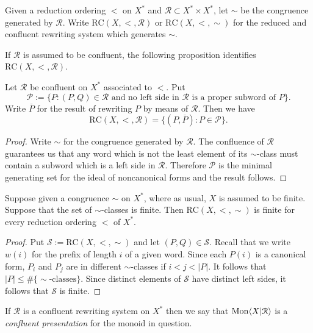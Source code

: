 \begin{defn} Given a reduction ordering $<$ on $X^*$ and $\mathcal{R} \subset
    X^* \times X^*$, let $\sim$ be the congruence generated by $\mathcal{R}$.
    Write $\mathrm{RC}(X,<,\mathcal{R})$ or $\mathrm{RC}(X,<,\sim)$ for the
    reduced and confluent rewriting system which generates $\sim$.

    If $\mathcal{R}$ is assumed to be confluent, the following proposition
    identifies $\mathrm{RC}(X,<,\mathcal{R})$.
\end{defn}

\begin{prop}\label{confluencecharacterization} Let $\mathcal{R}$ be confluent
    on $X^*$ associated to $<$. Put \emph{$$\mathcal{P} := \{ P : (P,Q) \in
        \mathcal{R} \text{ and no left side in } \mathcal{R} \text{ is a proper
        subword of } P \}.$$} Write $\overline{P}$ for the result of rewriting
        $P$ by means of $\mathcal{R}$. Then we have
        \[\mathrm{RC}(X,<,\mathcal{R}) = \{(P,\overline{P}) : P \in
        \mathcal{P}\}.\]
\end{prop}
\begin{proof} Write $\sim$ for the congruence generated by $\mathcal{R}$. The
    confluence of $\mathcal{R}$ guarantees us that any word which is not the
    least element of its $\sim$-class must contain a subword which is a left
    side in $\mathcal{R}$. Therefore $\mathcal{P}$ is the minimal generating
    set for the ideal of noncanonical forms and the result follows.
\end{proof}

\begin{prop} Suppose given a congruence $\sim$ on $X^*$, where as usual, $X$ is
    assumed to be finite. Suppose that the set of $\sim$-classes is finite.
    Then $\mathrm{RC}(X,<,\sim)$ is finite for every reduction ordering $<$ of
    $X^*$.
\end{prop}
\begin{proof} Put $\mathcal{S} := \mathrm{RC}(X,<,\sim)$ and let $(P,Q)\in
    \mathcal{S}$. Recall that we write $w(i)$ for the prefix of length $i$ of a
    given word. Since each $P(i)$ is a canonical form, $P_i$ and $P_j$ are in
    different $\sim$-classes if $i < j < |P|$. It follows that $|P| \le \#
    \{\sim\text{-classes}\}$. Since distinct elements of $\mathcal{S}$ have
    distinct left sides, it follows that $\mathcal{S}$ is finite.
\end{proof}

\begin{defn} If $\mathcal{R}$ is a confluent rewriting system on $X^*$ then we
    say that $\mathrm{Mon}\langle X|\mathcal{R}\rangle$ is a \emph{confluent presentation} for the
    monoid in question.
\end{defn}

